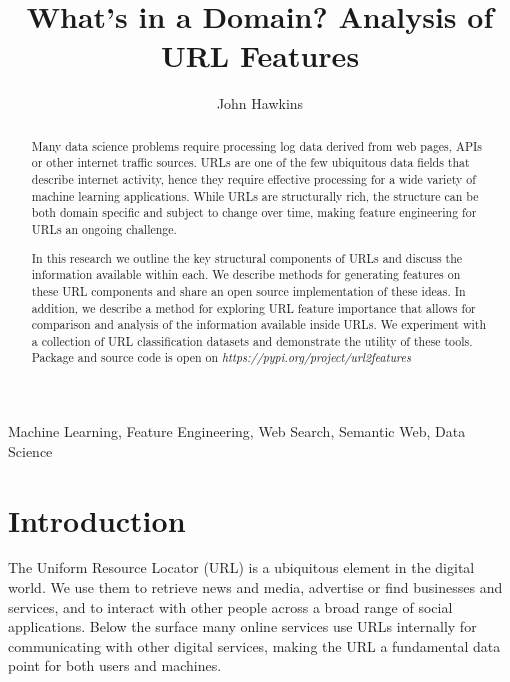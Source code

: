 \documentclass{aircc}
\begin{document}
\title{What's in a Domain? Analysis of URL Features}

\author{John Hawkins}

\maketitle

\begin{abstract}
Many data science problems require processing log data derived from web pages, APIs or other
internet traffic sources. URLs are one of the few ubiquitous data fields that describe
internet activity, hence they require effective processing for a wide variety of machine 
learning applications. While URLs are structurally rich, the structure can be both domain 
specific and subject to change over time, making feature engineering for URLs an ongoing 
challenge.

In this research we outline the key structural components of URLs and discuss the information
available within each. We describe methods for generating features on these URL components and 
share an open source implementation of these ideas. In addition, we describe a method for 
exploring URL feature importance that allows for comparison and analysis of the information 
available inside URLs.
We experiment with a collection of URL classification datasets and demonstrate the utility 
of these tools. Package and source code is open on \textit{https://pypi.org/project/url2features}
\end{abstract}

\begin{keywords}
Machine Learning, Feature Engineering, Web Search, Semantic Web, Data Science
\end{keywords}

\section{Introduction}

The Uniform Resource Locator (URL) is a ubiquitous element in the digital world. 
We use them to retrieve news and media, advertise or find businesses and services, 
and to interact with other people across a broad range of social applications. Below the
surface many online services use URLs internally for communicating with other digital
services, making the URL a fundamental data point for both users and machines.
\end{document}
